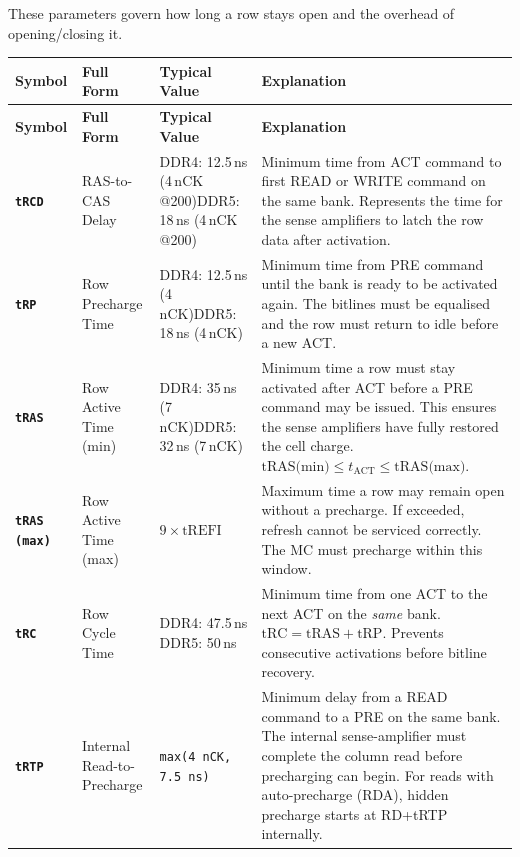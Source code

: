 \documentclass[11pt,a4paper]{article}
\newcommand{\sym}[1]{\texttt{\textbf{#1}}}
\begin{document}
These parameters govern how long a row stays open and the overhead of opening/closing it.

\begin{longtable}{L{2.2cm} L{4.8cm} L{3.5cm} L{4cm}}
\toprule
\textbf{Symbol} & \textbf{Full Form} & \textbf{Typical Value} & \textbf{Explanation} \\
\midrule
\endfirsthead
\toprule
\textbf{Symbol} & \textbf{Full Form} & \textbf{Typical Value} & \textbf{Explanation} \\
\midrule
\endhead
\bottomrule
\endfoot

\sym{tRCD} & RAS-to-CAS Delay & DDR4: 12.5\,ns (4\,nCK @200)\newline DDR5: 18\,ns (4\,nCK @200) &
  Minimum time from ACT command to first READ or WRITE command on the same bank. 
  Represents the time for the sense amplifiers to latch the row data after activation. \\

\sym{tRP} & Row Precharge Time & DDR4: 12.5\,ns (4\,nCK)\newline DDR5: 18\,ns (4\,nCK) &
  Minimum time from PRE command until the bank is ready to be activated again.
  The bitlines must be equalised and the row must return to idle before a new ACT. \\

\sym{tRAS} & Row Active Time (min) & DDR4: 35\,ns (7\,nCK)\newline DDR5: 32\,ns (7\,nCK) &
  Minimum time a row must stay activated after ACT before a PRE command may be issued.
  This ensures the sense amplifiers have fully restored the cell charge.
  $\text{tRAS(min)} \leq t_{\text{ACT}} \leq \text{tRAS(max)}$. \\

\sym{tRAS\,(max)} & Row Active Time (max) & $9 \times \text{tREFI}$ &
  Maximum time a row may remain open without a precharge. If exceeded, refresh cannot
  be serviced correctly. The MC must precharge within this window. \\

\sym{tRC} & Row Cycle Time & DDR4: 47.5\,ns \newline DDR5: 50\,ns &
  Minimum time from one ACT to the next ACT on the \textit{same} bank.
  $\text{tRC} = \text{tRAS} + \text{tRP}$. Prevents consecutive activations before bitline recovery. \\

\sym{tRTP} & Internal Read-to-Precharge & \texttt{max(4\,nCK, 7.5\,ns)} &
  Minimum delay from a READ command to a PRE on the same bank.
  The internal sense-amplifier must complete the column read before precharging can begin.
  For reads with auto-precharge (RDA), hidden precharge starts at RD+tRTP internally. \\


\end{longtable}
\end{document}
